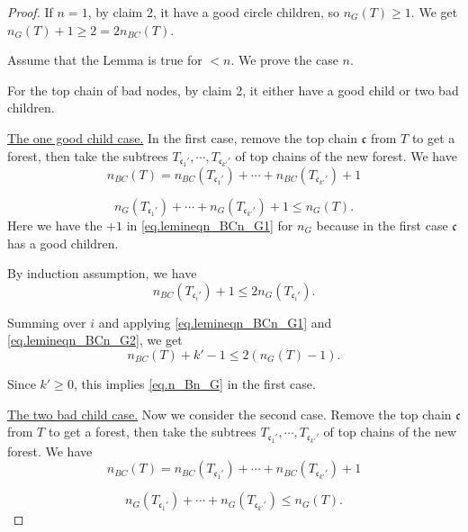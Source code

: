 \begin{proof}
If $n=1$, by claim 2, it have a good circle children, so $n_{G}(T)\ge 1$. We get $n_{G}(T)+1\ge 2 =2n_{BC}(T) $.

Assume that the Lemma is true for $<n$. We prove the case $n$. 


For the top chain of bad nodes, by claim 2, it either have a good child or two bad children.

\underline{The one good child case.} In the first case, remove the top chain $\mathfrak{c}$ from $T$ to get a forest, then take the subtrees $T_{\mathfrak{c}_1'},\cdots, T_{\mathfrak{c}_{k'}'}$ of top chains of the new forest. We have 
\begin{equation}\label{eq.lemineqn_BCn_G1}
    n_{BC}(T) = n_{BC}(T_{\mathfrak{c}_1'}) + \cdots + n_{BC}(T_{\mathfrak{c}_{k'}'}) + 1
\end{equation}

\begin{equation}\label{eq.lemineqn_BCn_G2}
     n_{G}(T_{\mathfrak{c}_1'}) + \cdots + n_{G}(T_{\mathfrak{c}_{k'}'}) + 1\le n_{G}(T).
\end{equation}
Here we have the $+1$ in \eqref{eq.lemineqn_BCn_G1} for $n_{G}$ because in the first case $\mathfrak{c}$ has a good children.

By induction assumption, we have
\begin{equation}
    n_{BC}(T_{\mathfrak{c}_i'}) + 1 \le 2n_{G}(T_{\mathfrak{c}_i'}).
\end{equation}

Summing over $i$ and applying \eqref{eq.lemineqn_BCn_G1} and \eqref{eq.lemineqn_BCn_G2}, we get 
\begin{equation}
    n_{BC}(T) + k'-1 \le 2(n_{G}(T)-1).
\end{equation}

Since $k'\ge 0$, this implies \eqref{eq.n_Bn_G} in the first case.

\underline{The two bad child case.} Now we consider the second case. Remove the top chain $\mathfrak{c}$ from $T$ to get a forest, then take the subtrees $T_{\mathfrak{c}_1'},\cdots, T_{\mathfrak{c}_{k'}'}$ of top chains of the new forest. We have 
\begin{equation}\label{eq.lemineqn_BCn_G3}
    n_{BC}(T) = n_{BC}(T_{\mathfrak{c}_1'}) + \cdots + n_{BC}(T_{\mathfrak{c}_{k'}'}) + 1
\end{equation}

\begin{equation}\label{eq.lemineqn_BCn_G4}
     n_{G}(T_{\mathfrak{c}_1'}) + \cdots + n_{G}(T_{\mathfrak{c}_{k'}'})\le n_{G}(T).
\end{equation}


\end{proof}
